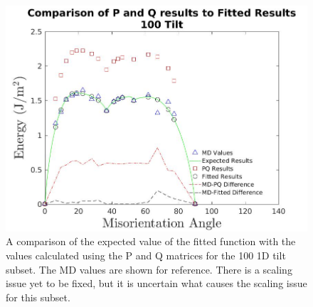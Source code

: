 \documentclass[twoside,senior]{BYUPhys}
\begin{document}
\begin{figure}[ht!]
 \centering
 \includegraphics[scale=0.26]{Images/100TiltPQvsMD}
 \caption[Comparison of the PQ matrices with the expected result for \textlangle{}100\textrangle{} tilt.]{\label{fig:100PQ} A comparison of the expected value of the fitted function with the values calculated using the P and Q matrices for the \textlangle{}100\textrangle{} 1D tilt subset.  The MD values are shown for reference.  There is a scaling issue yet to be fixed, but it is uncertain what causes the scaling issue for this subset.}
\end{figure}
\end{document}
